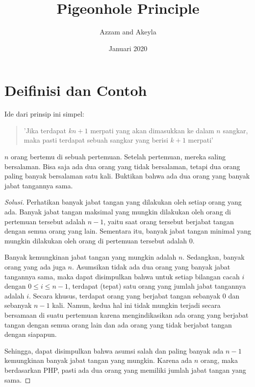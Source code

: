 \documentclass[11pt]{scrartcl}
\title{Pigeonhole Principle}
\author{Azzam and Akeyla}
\date{Januari 2020}
\begin{document}
\maketitle

\renewcommand*\contentsname{Daftar Isi}
\tableofcontents

\newpage

\section{Deifinisi dan Contoh}
Ide dari prinsip ini simpel:
\begin{quote}
    'Jika terdapat $kn + 1$ merpati yang akan dimasukkan ke dalam $n$ sangkar, maka pasti terdapat sebuah sangkar yang berisi $k + 1$ merpati'    
\end{quote}

\begin{example}
    $n$ orang bertemu di sebuah pertemuan. Setelah pertemuan, mereka saling bersalaman. Bisa saja ada dua orang yang tidak bersalaman, tetapi dua orang paling banyak bersalaman satu kali. Buktikan bahwa ada dua orang yang banyak jabat tangannya sama.
\end{example}


\begin{proof}[Solusi]
    Perhatikan banyak jabat tangan yang dilakukan oleh setiap orang yang ada. Banyak jabat tangan maksimal yang mungkin dilakukan oleh orang di pertemuan tersebut adalah $n - 1$, yaitu saat orang tersebut berjabat tangan dengan semua orang yang lain. Sementara itu, banyak jabat tangan minimal yang mungkin dilakukan oleh orang di pertemuan tersebut adalah $0$.
    
    Banyak kemungkinan jabat tangan yang mungkin adalah $n$. Sedangkan, banyak orang yang ada juga $n$. Asumsikan tidak ada dua orang yang banyak jabat tangannya sama, maka dapat disimpulkan bahwa untuk setiap bilangan cacah $i$ dengan $0 \leq i \leq n - 1$, terdapat (tepat) satu orang yang jumlah jabat tangannya adalah $i$. Secara khusus, terdapat orang yang berjabat tangan sebanyak $0$ dan sebanyak $n - 1$ kali. Namun, kedua hal ini tidak mungkin terjadi secara bersamaan di suatu pertemuan karena mengindikasikan ada orang yang berjabat tangan dengan semua orang lain dan ada orang yang tidak berjabat tangan dengan siapapun.
    
    Sehingga, dapat disimpulkan bahwa asumsi salah dan paling banyak ada $n - 1$ kemungkinan banyak jabat tangan yang mungkin. Karena ada $n$ orang, maka berdasarkan PHP, pasti ada dua orang yang memiliki jumlah jabat tangan yang sama. 
\end{proof}
\end{document}
